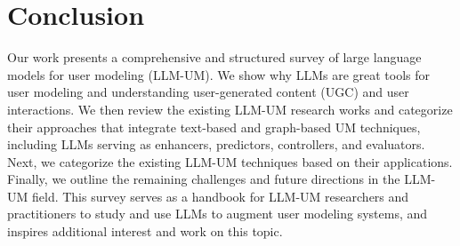\documentclass[11pt]{article}
\begin{document}
\section{Conclusion}
\label{sec:conclusion}
Our work presents a comprehensive and structured survey of large language models for user modeling (LLM-UM). We show why LLMs are great tools for user modeling and understanding user-generated content (UGC) and user interactions. We then review the existing LLM-UM research works and categorize their approaches that integrate text-based and graph-based UM techniques, including LLMs serving as enhancers, predictors, controllers, and evaluators. Next, we categorize the existing LLM-UM techniques based on their applications. Finally, we outline the remaining challenges and future directions in the LLM-UM field. This survey serves as a handbook for LLM-UM researchers and practitioners to study and use LLMs to augment user modeling systems, and inspires additional interest and work on this topic.

\small{


}

\end{document}
